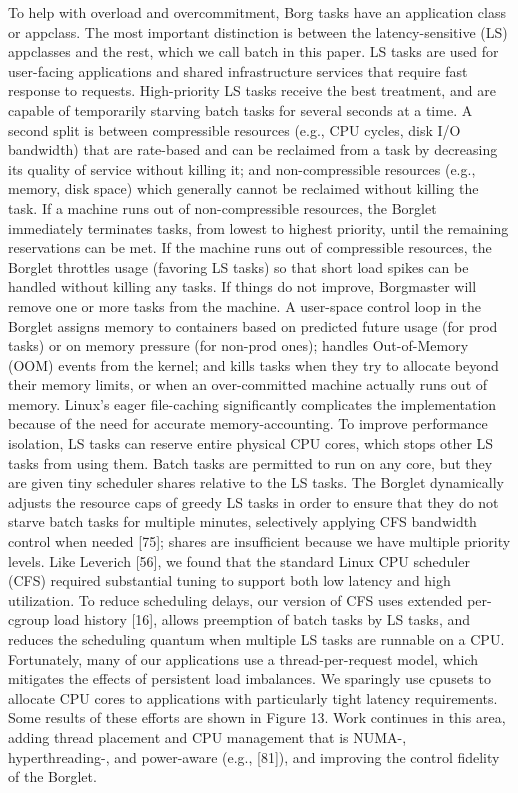 To help with overload and overcommitment, Borg tasks
have an application class or appclass. The most important
distinction is between the latency-sensitive (LS) appclasses
and the rest, which we call batch in this paper. LS tasks are
used for user-facing applications and shared infrastructure
services that require fast response to requests. High-priority
LS tasks receive the best treatment, and are capable of temporarily starving batch tasks for several seconds at a time.
A second split is between compressible resources (e.g.,
CPU cycles, disk I/O bandwidth) that are rate-based and
can be reclaimed from a task by decreasing its quality of
service without killing it; and non-compressible resources
(e.g., memory, disk space) which generally cannot be reclaimed without killing the task. If a machine runs out of
non-compressible resources, the Borglet immediately terminates tasks, from lowest to highest priority, until the remaining reservations can be met. If the machine runs out of compressible resources, the Borglet throttles usage (favoring LS
tasks) so that short load spikes can be handled without killing
any tasks. If things do not improve, Borgmaster will remove
one or more tasks from the machine.
A user-space control loop in the Borglet assigns memory to containers based on predicted future usage (for prod
tasks) or on memory pressure (for non-prod ones); handles
Out-of-Memory (OOM) events from the kernel; and kills
tasks when they try to allocate beyond their memory limits, or when an over-committed machine actually runs out
of memory. Linux’s eager file-caching significantly complicates the implementation because of the need for accurate
memory-accounting.
To improve performance isolation, LS tasks can reserve
entire physical CPU cores, which stops other LS tasks from
using them. Batch tasks are permitted to run on any core,
but they are given tiny scheduler shares relative to the LS
tasks. The Borglet dynamically adjusts the resource caps of
greedy LS tasks in order to ensure that they do not starve
batch tasks for multiple minutes, selectively applying CFS
bandwidth control when needed [75]; shares are insufficient
because we have multiple priority levels.
Like Leverich [56], we found that the standard Linux
CPU scheduler (CFS) required substantial tuning to support
both low latency and high utilization. To reduce scheduling delays, our version of CFS uses extended per-cgroup
load history [16], allows preemption of batch tasks by LS
tasks, and reduces the scheduling quantum when multiple LS
tasks are runnable on a CPU. Fortunately, many of our applications use a thread-per-request model, which mitigates
the effects of persistent load imbalances. We sparingly use
cpusets to allocate CPU cores to applications with particularly tight latency requirements. Some results of these efforts
are shown in Figure 13. Work continues in this area, adding
thread placement and CPU management that is NUMA-,
hyperthreading-, and power-aware (e.g., [81]), and improving the control fidelity of the Borglet.


